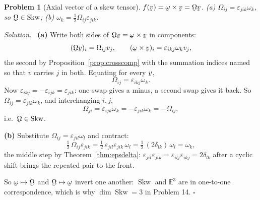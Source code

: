 \documentclass[17pt,a4paper]{extreport}
\DeclareRobustCommand{\vek}[1]{\underaccent{\tilde}{#1}}
\newcommand{\Et}{\mathbb{E}^{3}}
\newcommand{\Skw}{\operatorname{Skw}}
\newcommand{\bv}{\vek{v}}
\newcommand{\bOm}{\vek{\Omega}}
\newcommand{\bom}{\vek{\omega}}
\newcommand{\dd}{\delta}
\newcommand{\eps}{\varepsilon}
\theoremstyle{scplain}
\theoremstyle{scdefn}
\theoremstyle{scplain}
\newtheorem{problem}{Problem}
\newenvironment{solution}
 {\par\smallskip\noindent\textit{Solution.}\ }
 {\hfill$\square$\par\medskip}
\begin{document}
\begin{problem}[Axial vector of a skew tensor]
$f(\bv)=\bom\times\bv=\bOm\bv$. (a) $\Omega_{ij}=\eps_{jik}\omega_k$, so
$\bOm\in\Skw$; (b) $\omega_k=\tfrac12\Omega_{ij}\eps_{jik}$.
\end{problem}
\begin{solution}
\textbf{(a)} Write both sides of $\bOm\bv=\bom\times\bv$ in components:
\[
   (\bOm\bv)_i=\Omega_{ij}v_j,
   \qquad
   (\bom\times\bv)_i=\eps_{ikj}\omega_kv_j ,
\]
the second by Proposition~\ref{prop:crosscomp} with the summation indices
named so that $v$ carries $j$ in both. Equating for every $\bv$,
\[
   \Omega_{ij}=\eps_{ikj}\omega_k .
\]
Now $\eps_{ikj}=-\eps_{ijk}=\eps_{jik}$: one swap gives a minus, a second
swap gives it back. So $\Omega_{ij}=\eps_{jik}\omega_k$, and
interchanging $i,j$,
\[
   \Omega_{ji}=\eps_{ijk}\omega_k=-\eps_{jik}\omega_k=-\Omega_{ij},
\]
i.e.\ $\bOm\in\Skw$.

\textbf{(b)} Substitute $\Omega_{ij}=\eps_{jil}\omega_l$ and contract:
\[
   \tfrac12\,\Omega_{ij}\eps_{jik}
   =\tfrac12\,\eps_{jil}\eps_{jik}\,\omega_l
   =\tfrac12\,(2\dd_{lk})\,\omega_l=\omega_k ,
\]
the middle step by Theorem~\ref{thm:epsdelta}: $\eps_{jil}\eps_{jik}
=\eps_{ilj}\eps_{ikj}=2\dd_{lk}$ after a cyclic shift brings the repeated
pair to the front.

So $\bom\mapsto\bOm$ and $\bOm\mapsto\bom$ invert one another: $\Skw$ and
$\Et$ are in one-to-one correspondence, which is why
$\dim\Skw=3$ in Problem 14.
\end{solution}
\end{document}
